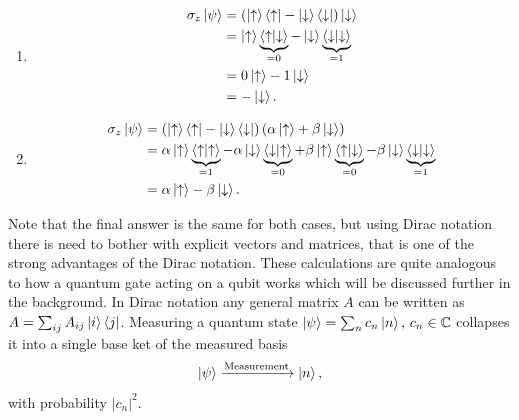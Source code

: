 \begin{enumerate}[label=\textbf{\alph*)}]
\item
\begin{equation}
\begin{aligned}
\sigma_z \ket{\psi} &= (\ket{\uparrow}\bra{\uparrow} - \ket{\downarrow}\bra{\downarrow})\ket{\downarrow} \\&= \ket{\uparrow}\underbrace{\bra{\uparrow}\ket{\downarrow}}_{ = 0} - \ket{\downarrow}\underbrace{\bra{\downarrow}\ket{\downarrow}}_{ = 1} \\&= 0\ket{\uparrow} - 1\ket{\downarrow} \\&= -\ket{\downarrow}.
\end{aligned}
\end{equation}
\item 
\begin{equation}
\begin{aligned}
\sigma_z \ket{\psi} &= \left( \ket{\uparrow}\bra{\uparrow} - \ket{\downarrow}\bra{\downarrow} \right) \left(\alpha\ket{\uparrow} + \beta\ket{\downarrow} \right) \\&= 
\alpha\ket{\uparrow}\underbrace{\bra{\uparrow}\ket{\uparrow}}_{ = 1} - \alpha\ket{\downarrow}\underbrace{\bra{\downarrow}\ket{\uparrow}}_{ = 0}
+
\beta\ket{\uparrow}\underbrace{\bra{\uparrow}\ket{\downarrow}}_{ = 0} - \beta\ket{\downarrow}\underbrace{\bra{\downarrow}\ket{\downarrow}}_{ = 1}\\&= \alpha\ket{\uparrow} - \beta\ket{\downarrow}.
\end{aligned}
\end{equation}
\end{enumerate}
Note that the final answer is the same for both cases, but using Dirac notation there is need to bother with explicit vectors and matrices, that is one of the strong advantages of the Dirac notation. These calculations are quite analogous to how a quantum gate acting on a qubit works which will be discussed further in the background. In Dirac notation any general matrix $A$ can be written as $A = \sum_{ij} A_{ij}\ket{i}\bra{j}$. Measuring a quantum state $\ket{\psi} = \sum_{n}c_n\ket{n},\, c_n\in \mathbb{C}$ collapses it into a single base ket of the measured basis
\begin{equation}
\ket{\psi} \xrightarrow{\text{Measurement}} \ket{n},
\end{equation}
with probability $|c_n|^2$. 



